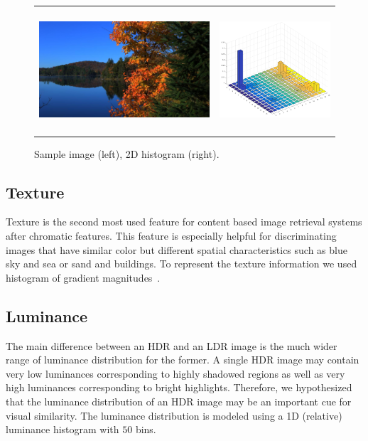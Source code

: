 \begin{figure}
\centering
\caption{Sample image (left), 2D histogram (right).}
\label{fig:hists}
\begin{tabular}{c c}
\includegraphics[height=1.8in]{figures/chapter2/MasonLake.jpg} &
\includegraphics[height=1.8in]{figures/chapter2/57_histab.png}

\end{tabular}
\end{figure}

\subsection{Texture}
Texture is the second most used feature for content based image retrieval systems after chromatic features.  This feature is especially helpful for discriminating images that have similar color but different spatial characteristics such as blue sky and sea or sand and buildings.  To represent the texture information we used histogram of gradient magnitudes~\cite{sharma2015histogram}.
\subsection{Luminance}
The main difference between an HDR and an LDR image is the much wider range of luminance distribution for the former. A single HDR image may contain very low luminances corresponding to highly shadowed regions as well as very high luminances corresponding to bright highlights. Therefore, we hypothesized that the luminance distribution of an HDR image may be an important cue for visual similarity. The luminance distribution is modeled using a 1D (relative) luminance histogram with $50$ bins.
